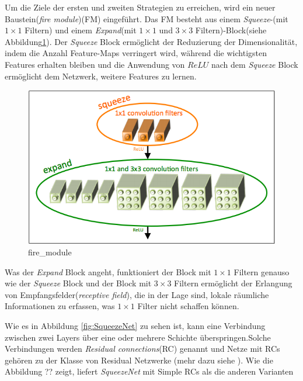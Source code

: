 \documentclass[12pt,a4paper]{scrartcl}
\numberwithin{equation}{section}
\begin{document}
Um die Ziele der ersten und zweiten Strategien zu erreichen, wird ein neuer Baustein(\textit{fire module})(FM) eingeführt. Das FM besteht aus einem \textit{Squeeze}-(mit $ 1\times1 $ Filtern) und einem \textit{Expand}(mit $ 1\times1 $ und $ 3\times3 $ Filtern)-Block(siehe Abbildung\ref{fig:fire_module}). Der \textit{Squeeze} Block ermöglicht der Reduzierung der Dimensionalität, indem die Anzahl Feature-Maps verringert wird, während die wichtigsten Features erhalten bleiben und die Anwendung von $ ReLU $ nach dem \textit{Squeeze} Block ermöglicht dem Netzwerk, weitere Features zu lernen.

\begin{figure}[h]
	\centering
	\includegraphics[width=\textwidth ]{fire_module}
	\caption{ fire\_module \cite{SqueezeNet} }
	\label{fig:fire_module}
\end{figure}

Was der \textit{Expand} Block angeht, funktioniert der Block mit $ 1\times1 $ Filtern genauso wie der \textit{Squeeze} Block und der Block mit $ 3\times3 $ Filtern ermöglicht der Erlangung von Empfangsfelder(\textit{receptive field}), die in der Lage sind, lokale räumliche Informationen zu erfassen, was $ 1\times1 $ Filter nicht schaffen können.

Wie es in Abbildung \ref{fig:SqueezeNet} zu sehen ist, kann eine Verbindung zwischen zwei Layers über eine oder mehrere Schichte überspringen.Solche Verbindungen werden \textit{Residual connections}(RC) genannt und Netze mit RCs gehören zu der Klasse von Residual Netzwerke (mehr dazu siehe \cite{ResNet}).
Wie die Abbildung ?? zeigt, liefert \textit{SqueezeNet} mit Simple RCs  als die anderen Varianten
\end{document}
